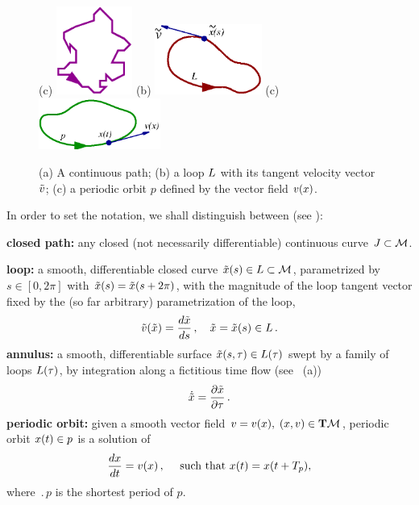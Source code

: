 \begin{figure}[t] %
\centering
(c) \includegraphics[width=2.5cm]{figs/path.eps}
\hspace{0.1in}
(b) \includegraphics[width=3.5cm]{figs/loop.eps}
\hspace{0.1in}
(c) \includegraphics[width=4.0cm]{figs/porbit.eps}
\caption{
 (a) A continuous path; (b) a loop $L$ with its tangent velocity vector $\tilde{v}$;
 (c) a periodic orbit $p$ defined by the vector field $v(x)$.
        }
\label{f:loops}
\end{figure}

    In order to set the notation, we shall distinguish between (see ):

\medskip
\noindent
 {\bf closed path:}
 any closed (not necessarily differentiable) continuous curve 
$J \subset {\cal M}$.

\medskip
\noindent
{\bf loop:}
 a smooth, differentiable closed curve $\tilde{x}(s)\in L \subset 
{\cal M}$, 
parametrized by $s \in [0,2\pi]$ with $\tilde{x}(s)=\tilde{x}(s+2\pi)$, with the
magnitude of the loop tangent vector fixed by 
the (so far arbitrary) parametrization of the loop,
\[
\tilde{v}(\tilde{x})=\frac{d \tilde{x}}{ds}\,, \quad \tilde{x}=\tilde{x}(s) \in L
\,.
\]   
{\bf annulus:} 
 a smooth, differentiable surface $\tilde{x}(s,\tau)\in L(\tau)$ swept by a 
family of loops $L(\tau)$, by integration along a fictitious time flow
(see ~(a))
\[
\dot{\tilde{x}}=\frac{\partial \tilde{x}}{\partial \tau}
\,.
\]
{\bf periodic orbit:}
 given a smooth vector field $v=v(x),\; (x,v) \in {\bf T} {\cal M}$, periodic orbit $x(t) \in p$ is a solution of
\[
\frac{dx}{dt}=v(x) 
	\,,\quad
	\mbox{ such that } x(t)=x(t+{T_{p}}),
\] 
where $\period{p}$ is the shortest period of $p$.



